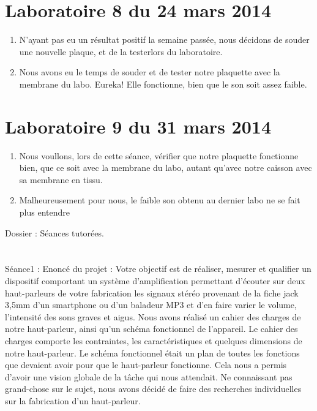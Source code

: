\documentclass{report}
\begin{document}
\section{Laboratoire 8 du 24 mars 2014}

\begin{enumerate}

\item
N'ayant pas eu un résultat positif la semaine passée, nous décidons de souder une nouvelle plaque, et de la testerlors du laboratoire.
\item Nous avons eu le temps de souder et de tester notre plaquette avec la membrane du labo. 
Eureka! Elle fonctionne, bien que le son soit assez faible.

\end{enumerate}
\section{Laboratoire 9 du 31 mars 2014}
\begin{enumerate}
\item Nous voullons, lors de cette séance, vérifier que notre plaquette fonctionne bien, que ce soit avec la membrane du labo, autant qu'avec notre caisson avec sa membrane en tissu. 
\item Malheureusement pour nous, le faible son obtenu au dernier labo ne se fait plus entendre
\end{enumerate}









Dossier : Séances tutorées.

\section{}
Séance1 : Enoncé du projet : Votre objectif est de réaliser, mesurer et qualifier un dispositif comportant un système d’amplification permettant d’écouter sur deux haut-parleurs de votre fabrication les signaux stéréo provenant de la fiche jack 3,5mm d’un smartphone ou d’un baladeur MP3 et d’en faire varier le volume, l’intensité des sons graves et aigus.
Nous avons réalisé un cahier des charges de notre haut-parleur, ainsi qu’un schéma fonctionnel de l’appareil.  Le cahier des charges comporte les contraintes, les caractéristiques et quelques dimensions de notre haut-parleur.  Le schéma fonctionnel était un plan de toutes les fonctions que devaient avoir pour que le haut-parleur fonctionne.  Cela nous a permis d’avoir une vision globale de la tâche qui nous attendait. Ne connaissant pas grand-chose sur le sujet, nous avons décidé de faire des recherches individuelles sur la fabrication d’un haut-parleur.  
\end{document}
